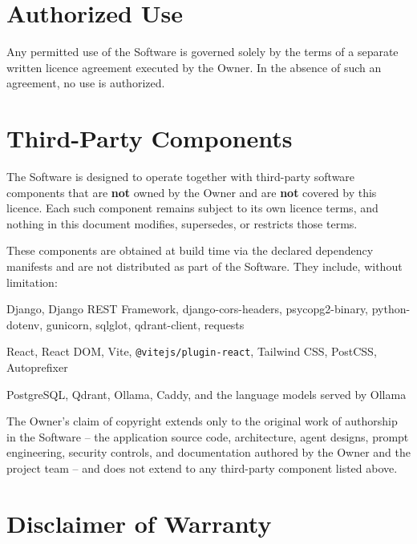 \documentclass[11pt,a4paper]{article}
\begin{document}
\section{Authorized Use}

Any permitted use of the Software is governed solely by the terms of a
separate written licence agreement executed by the Owner. In the absence of
such an agreement, no use is authorized.

\section{Third-Party Components}

The Software is designed to operate together with third-party software
components that are \textbf{not} owned by the Owner and are \textbf{not}
covered by this licence. Each such component remains subject to its own
licence terms, and nothing in this document modifies, supersedes, or
restricts those terms.

These components are obtained at build time via the declared dependency
manifests and are not distributed as part of the Software. They include,
without limitation:

\begin{description}[leftmargin=2em, style=nextline]
    \item[Backend \textit{(see backend/requirements.txt)}]
    Django, Django REST Framework, django-cors-headers, psycopg2-binary,
    python-dotenv, gunicorn, sqlglot, qdrant-client, requests

    \item[Frontend \textit{(see frontend/package.json)}]
    React, React DOM, Vite, \texttt{@vitejs/plugin-react}, Tailwind CSS,
    PostCSS, Autoprefixer

    \item[Container images \textit{(see docker-compose.yml)}]
    PostgreSQL, Qdrant, Ollama, Caddy, and the language models served by
    Ollama
\end{description}

The Owner's claim of copyright extends only to the original work of
authorship in the Software -- the application source code, architecture,
agent designs, prompt engineering, security controls, and documentation
authored by the Owner and the project team -- and does not extend to any
third-party component listed above.

\section{Disclaimer of Warranty}
\end{document}
